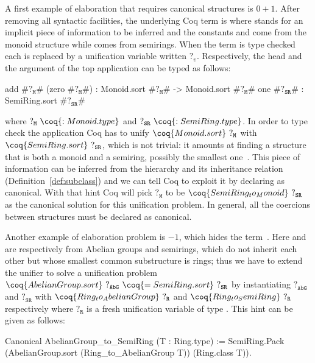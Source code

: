 \documentclass[a4paper,UKenglish,cleveref, autoref]{lipics-v2019}
\theoremstyle{implem}
\theoremstyle{implem}
\theoremstyle{command}
\theoremstyle{commands}
\begin{document}
A first example of elaboration that requires canonical structures is \(0 + 1\).
After removing all syntactic facilities, the underlying Coq term is
 where \coq{_} stands for an implicit piece
of information to be inferred and the constants  and  come
from the monoid structure while  comes from semirings.
When the term is type checked each \coq{_} is replaced by a unification
variable written $?_v$.
Respectively, the head and the argument of the top application
can be typed as follows:
\begin{coqcode}
  add #$?_{\texttt{M}}$# (zero #$?_{\texttt{M}}$#) : Monoid.sort #$?_{\texttt{M}}$# -> Monoid.sort #$?_{\texttt{M}}$#
  one #$?_{\texttt{SR}}$# : SemiRing.sort #$?_{\texttt{SR}}$#
\end{coqcode}
where \(?_{\texttt{M}}~\coq{: Monoid.type}\) and
\(?_{\texttt{SR}}~\coq{: SemiRing.type}\).
In order to type check the application Coq has to unify \(\coq{Monoid.sort}~?_{\texttt{M}}\) with
\(\coq{SemiRing.sort}~?_{\texttt{SR}}\), which is not trivial: it amounts at
finding a structure that is both a monoid and a semiring, possibly the
smallest one~\cite[Sect.~4]{KSdraft}.
This piece of information can be inferred from the hierarchy and its inheritance
relation (Definition~\ref{def:subclass}) and we can tell Coq to exploit it by
declaring  as
canonical. With that hint Coq will pick \(?_{\texttt{M}}\) to be
\(\coq{SemiRing_to_Monoid}~?_{\texttt{SR}}\) as the canonical solution for this
unification problem.
In general, all the coercions between structures must be declared
as canonical. %

Another example of elaboration problem is \(- 1\), which hides the term~.
Here  and  are respectively from Abelian groups and semirings,
which do not inherit each other but whose smallest common substructure is
rings; thus we have to extend the unifier to solve a unification problem
\(\coq{AbelianGroup.sort}~?_{\texttt{AbG}}~\coq{= SemiRing.sort}~?_{\texttt{SR}}\) by instantiating \(?_{\texttt{AbG}}\) and \(?_{\texttt{SR}}\) with \(\coq{Ring_to_AbelianGroup}~?_{\texttt{R}}\) and \(\coq{Ring_to_SemiRing}~?_{\texttt{R}}\) respectively where \(?_{\texttt{R}}\) is a fresh unification variable of type .
This hint can be given as follows:%
\begin{coqcode}
Canonical AbelianGroup_to_SemiRing (T : Ring.type) :=
  SemiRing.Pack (AbelianGroup.sort (Ring_to_AbelianGroup T)) (Ring.class T)).
\end{coqcode}
\end{document}
